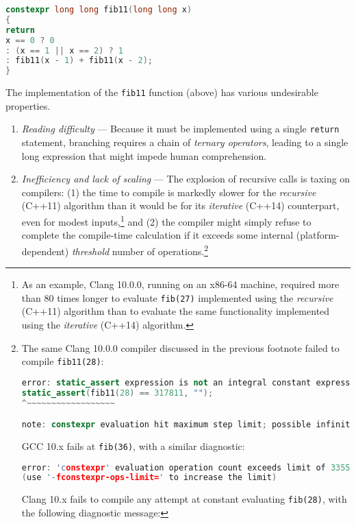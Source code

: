 \begin{lstlisting}[language=C++]
constexpr long long fib11(long long x)
{
return
x == 0 ? 0
: (x == 1 || x == 2) ? 1
: fib11(x - 1) + fib11(x - 2);
}
\end{lstlisting}

\noindent The implementation of the \texttt{fib11} function (above) has various
undesirable properties.
\begin{enumerate}
\item{\emph{Reading difficulty} — Because it must be implemented using a single \texttt{return} statement, branching requires a chain of \emph{ternary operators}, leading to a single long expression that might impede human comprehension.}
\item{\emph{Inefficiency and lack of scaling} — The explosion of recursive calls is taxing on compilers: (1) the time to compile is markedly slower for the \emph{recursive} (C++11) algorithm than it would be for its \emph{iterative} (C++14) counterpart, even for modest inputs,{\cprotect\footnote{As an example, Clang 10.0.0, running on an x86-64 machine, required more than 80 times longer to evaluate \texttt{fib(27)} implemented using the \emph{recursive} (C++11) algorithm than to evaluate the same functionality implemented using the \emph{iterative} (C++14) algorithm.}} and (2) the compiler might simply refuse to complete the compile-time calculation if it exceeds some internal (platform-dependent) \emph{threshold} number of operations.{\cprotect\footnote{The same Clang 10.0.0 compiler discussed in the previous footnote failed to compile \texttt{fib11(28)}:

\begin{lstlisting}[language=C++, basicstyle={\ttfamily\footnotesize}]
error: static_assert expression is not an integral constant expression
static_assert(fib11(28) == 317811, "");
^~~~~~~~~~~~~~~~~~~

note: constexpr evaluation hit maximum step limit; possible infinite loop?
\end{lstlisting}

\noindent GCC 10.x fails at \texttt{fib(36)}, with a similar diagnostic:

\begin{lstlisting}[language=C++, basicstyle={\ttfamily\footnotesize}]
error: 'constexpr' evaluation operation count exceeds limit of 33554432
(use '-fconstexpr-ops-limit=' to increase the limit)
\end{lstlisting}

\noindent Clang 10.x fails to compile any attempt at constant evaluating \texttt{fib(28)}, with the following diagnostic message:

}}}
\end{enumerate}
